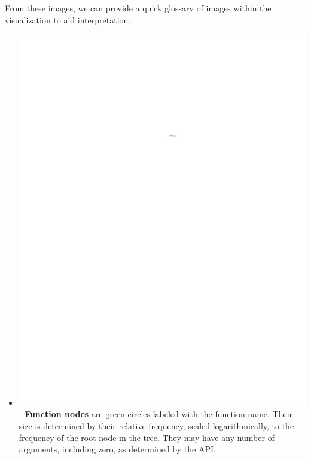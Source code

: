 \documentclass[conference]{IEEEtran}
\begin{document}
	From these images, we can provide a quick glossary of images within the visualization
	to aid interpretation.
	\begin{itemize}
		\item \includegraphics{glossary-green} - \textbf{Function nodes} are green
		circles labeled with the function name. Their size is determined by their
		relative frequency, scaled logarithmically, to the frequency of the root node
		in the tree. They may have any number of arguments, including zero, as
		determined by the API.
		

\end{itemize}
\end{document}
